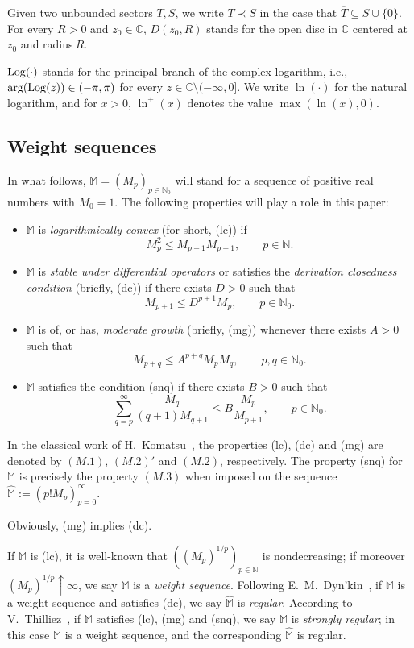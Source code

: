 \documentclass[12pt,leqno]{amsart}
\def\C{\mathbb{C}}
\def\N{\mathbb{N}}
\theoremstyle{plain}
\theoremstyle{definition}
\numberwithin{equation}{section}
\def\Log{\mathop{\rm Log}\nolimits}
\def\M{\mathbb{M}}
\newcommand{\hM}{\widehat{\M}}
\begin{document}
Given two unbounded sectors $T,S$, we write $T\prec S$ in the case that $\overline{T}\subseteq S\cup\{0\}$. For every $R>0$ and $z_0\in\C$, $D(z_0,R)$ stands for the open disc in $\C$ centered at $z_0$ and radius$~R$.

$\Log(\cdot)$ stands for the principal branch of the complex logarithm, i.e., $\hbox{arg}(\Log(z))\in(-\pi,\pi)$ for every $z\in\C\setminus(-\infty,0]$. We write $\ln(\cdot)$ for the natural logarithm, and for $x>0$, $\ln^+(x)$ denotes the value $\max(\ln(x),0)$.


\subsection{Weight sequences}\label{subsec.WeightSeq} In what follows, $\M=(M_p)_{p\in\N_0}$ will stand for a sequence of positive real numbers with $M_0=1$. The following properties will play a role in this paper:


\begin{itemize}
\item[(i)]  $\M$ is \emph{logarithmically convex} (for short, (lc)) if
$$M_{p}^{2}\le M_{p-1}M_{p+1},\qquad p\in\N.$$%
\item[(ii)] $\M$ is \emph{stable under differential operators} or satisfies the \emph{derivation closedness condition} (briefly, (dc)) if there exists $D>0$ such that $$M_{p+1}\leq D^{p+1} M_{p},  \qquad p\in\N_{0}. $$
\item[(iii)]  $\M$ is of, or has, \emph{moderate growth} (briefly, (mg)) whenever there exists $A>0$ such that
$$M_{p+q}\le A^{p+q}M_{p}M_{q},\qquad p,q\in\N_0.$$
\item[(iv)]  $\M$ satisfies the condition (snq) if there exists $B>0$ such that
$$
\sum^\infty_{q= p}\frac{M_{q}}{(q+1)M_{q+1}}\le B\frac{M_{p}}{M_{p+1}},\qquad p\in\N_0.$$
\end{itemize}


In the classical work of H.~Komatsu~\cite{komatsu}, the properties (lc), (dc) and (mg) are denoted by $(M.1)$, $(M.2)'$ and $(M.2)$, respectively. The property (snq) for $\M$ is precisely the property $(M.3)$ when imposed on the sequence $\widehat{\M}:=(p!M_p)_{p=0}^\infty$.

Obviously, (mg) implies (dc).

If $\M$ is (lc), it is well-known that $((M_p)^{1/p})_{p\in\N}$ is nondecreasing; if moreover $(M_p)^{1/p}\uparrow\infty$, we say $\M$ is a \emph{weight sequence}.
Following E.~M.~Dyn'kin~\cite{Dynkin80}, if $\M$ is a weight sequence and satisfies (dc), we say $\hM$ is \emph{regular}. According to V.~Thilliez~\cite{Thilliez03}, if $\M$ satisfies (lc), (mg) and (snq), we say $\M$ is \emph{strongly regular}; in this case $\M$ is a weight sequence, and the corresponding $\hM$ is regular.
\end{document}
